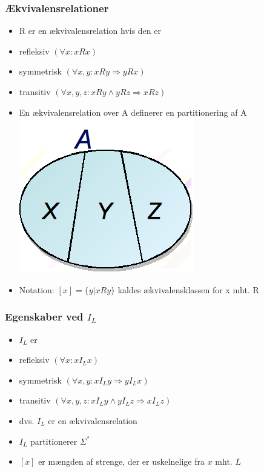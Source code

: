 \documentclass[]{beamer}
\begin{document}
\begin{frame}
\frametitle{Ækvivalensrelationer}
\begin{itemize}[<+->]
\item R er en ækvivalensrelation hvis den er
  \item
refleksiv  $(\forall x:  x R x)$
\item
symmetrisk $(\forall x,y:  x R y \Rightarrow y R x)$
\item
transitiv $(\forall x,y,z:  x R y \wedge  y R z \Rightarrow x R z)$
\item
En ækvivalensrelation over A definerer 
en partitionering af A
\includegraphics[scale=0.4]{images/2_seminar_equivclasses}
\item
Notation:  $[x] = \{y | x R y\}$ kaldes 
ækvivalensklassen for x mht. R
\end{itemize}
\end{frame}

\begin{frame}
\frametitle{Egenskaber ved $I_L$}
\begin{itemize}[<+->]
\item $I_L$ er
\item refleksiv  $(\forall x:  x I_L x)$
\item symmetrisk $(\forall x,y:  x I_L y \Rightarrow  y I_L x)$
\item transitiv $(\forall x,y,z:  x I_L y \wedge  y I_L z \Rightarrow  x I_L z)$
\item dvs. $I_L$ er en ækvivalensrelation
\item
$I_L$ partitionerer $\Sigma^*$
\item
$[x]$ er mængden af strenge, der er uskelnelige fra $x$ mht. $L$
\end{itemize}
\end{frame}
\end{document}
